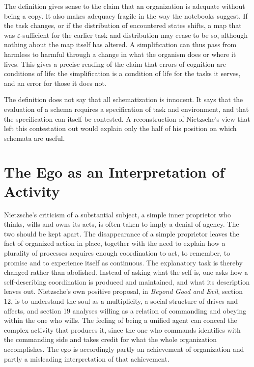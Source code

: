 The definition gives sense to the claim that an organization is adequate without being a copy. It also makes adequacy fragile in the way the notebooks suggest. If the task changes, or if the distribution of encountered states shifts, a map that was $\varepsilon$-sufficient for the earlier task and distribution may cease to be so, although nothing about the map itself has altered. A simplification can thus pass from harmless to harmful through a change in what the organism does or where it lives. This gives a precise reading of the claim that errors of cognition are conditions of life: the simplification is a condition of life for the tasks it serves, and an error for those it does not.

\begin{remark}
The definition does not say that all schematization is innocent. It says that the evaluation of a schema requires a specification of task and environment, and that the specification can itself be contested. A reconstruction of Nietzsche's view that left this contestation out would explain only the half of his position on which schemata are useful.
\end{remark}

\chapter{The Ego as an Interpretation of Activity}

Nietzsche's criticism of a substantial subject, a simple inner proprietor who thinks, wills and owns its acts, is often taken to imply a denial of agency. The two should be kept apart. The disappearance of a simple proprietor leaves the fact of organized action in place, together with the need to explain how a plurality of processes acquires enough coordination to act, to remember, to promise and to experience itself as continuous. The explanatory task is thereby changed rather than abolished. Instead of asking what the self is, one asks how a self-describing coordination is produced and maintained, and what its description leaves out. Nietzsche's own positive proposal, in \emph{Beyond Good and Evil}, section 12, is to understand the soul as a multiplicity, a social structure of drives and affects, and section 19 analyses willing as a relation of commanding and obeying within the one who wills. The feeling of being a unified agent can conceal the complex activity that produces it, since the one who commands identifies with the commanding side and takes credit for what the whole organization accomplishes. The ego is accordingly partly an achievement of organization and partly a misleading interpretation of that achievement.

